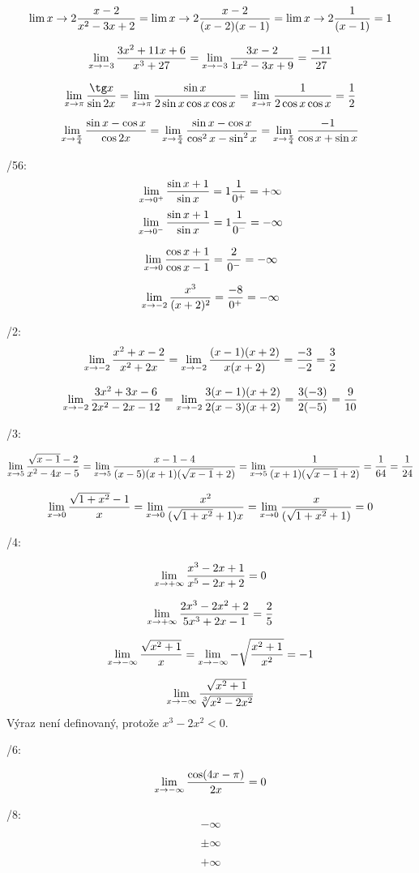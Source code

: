 \Pr
$$
\lim{x\rightarrow2} \frac{x-2}{x^2-3x+2}
=
\lim{x\rightarrow2} \frac{x-2}{(x-2)(x-1)}
=
\lim{x\rightarrow2} \frac{1}{(x-1)}
= 1
$$

$$
\lim_{x\rightarrow -3} \frac{3x^2+11x+6}{x^3+27}
=
\lim_{x\rightarrow -3} \frac{3x-2}{1x^2-3x+9} =\frac{-11}{27}
$$

$$
\lim_{x\r \pi} \f{\tg x}{\sin 2x} 
=
\lim_{x\r \pi} \f{\sin x}{2\sin x \cos x \cos x} 
=
\lim_{x\r \pi} \f{1}{2\cos x \cos x} = \f 12
$$

$$
\lim_{x\rightarrow\frac\pi4} \frac{\sin x-\cos x}{\cos 2x}
=
\lim_{x\rightarrow\frac\pi4} \frac{\sin x-\cos x}{\cos^2 x-\sin^2 x}
=
\lim_{x\rightarrow\frac\pi4} \frac{-1}{\cos x+\sin x}
$$

/56:
$$
\lim_{x\r 0^+} \f{\sin x+1}{\sin x}
=
1 \*  \f{1}{0^+}
=
+\infty
$$
$$
\lim_{x\r 0^-} \f{\sin x+1}{\sin x}
=
1 \* \f{1}{0^-}
=
-\infty
$$


$$
\lim_{x\rightarrow 0} \frac{\cos x+1}{\cos x-1}
=
\frac{2}{0^-}
=
-\infty
$$

$$
\lim_{x\rightarrow -2} \frac{x^3}{(x+2)^2}
=
\frac{-8}{0^+}
= -\infty
$$

/2:
$$
\lim_{x\rightarrow -2} \frac{x^2+x-2}{x^2+2x}
=
\lim_{x\rightarrow -2} \frac{(x-1)(x+2)}{x(x+2)}
=
\frac{-3}{-2}=\frac32
$$

$$
\lim_{x\rightarrow -2} \frac{3x^2+3x-6}{2x^2-2x-12}
=
\lim_{x\rightarrow -2} \frac{3(x-1)(x+2)}{2(x-3)(x+2)}
=
\frac{3(-3)}{2(-5)}=\frac 9{10}
$$

/3:

$$
\lim_{x\r5}\f{\sqrt{x-1}-2}{x^2-4x-5}
=
\lim_{x\r5}\f{x-1-4}{(x-5)(x+1)(\sqrt{x-1}+2)}
=
\lim_{x\r5}\f{1}{(x+1)(\sqrt{x-1}+2)}
=
\f{1}{6\* 4} = \f1{24}
$$

$$
\lim_{x\rightarrow0} \frac{\sqrt{ 1 + x^2} -1}{x}
=
\lim_{x\rightarrow0} \frac{x^2}{(\sqrt{ 1 + x^2} +1)x}
=
\lim_{x\rightarrow0} \frac{x}{(\sqrt{ 1 + x^2} +1)}
=
0
$$

/4:

$$
\lim_{x\rightarrow+\infty} \frac{x^3-2x+1}{x^5-2x+2} = 0
$$


$$
\lim_{x\rightarrow+\infty} \frac{2x^3-2x^2+2}{5x^3+2x-1} = \frac 2 5
$$

\Pr 
$$
\lim_{x\rightarrow -\infty} \frac{\sqrt{x^2+1}}x
= 
\lim_{x\rightarrow -\infty} -\sqrt{\frac{x^2+1}{x^2}} = -1
$$

$$
\lim_{x\rightarrow -\infty} \frac{\sqrt{x^2+1}}{\sqrt[3]{x^2-2x^2}}
$$
Výraz není definovaný, protože $x^3-2x^2<0$.

/6:

$$
\lim_{x\rightarrow -\infty} \frac{\cos(4x-\pi)}{2x}
= 
0
$$

/8:
$$-\infty$$

$$\pm\infty$$

$$+\infty$$

